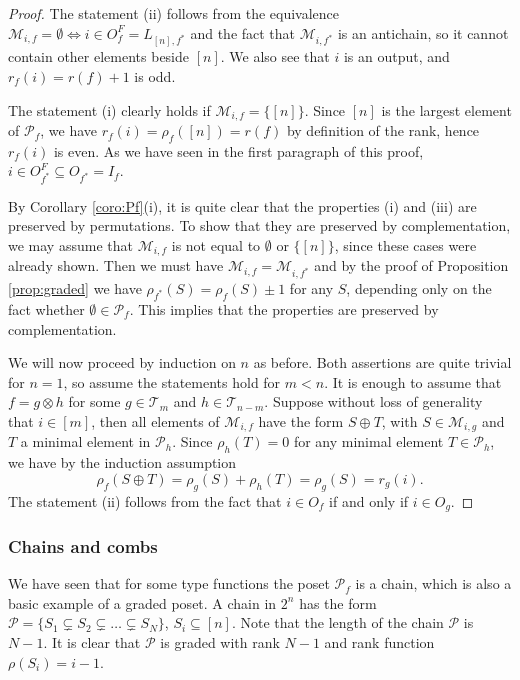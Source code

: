 \documentclass[12pt]{article}
\theoremstyle{definition}
\theoremstyle{remark}
\def\Me{\mathcal M}
\def\Te{\mathcal T}
\def\Pe{\mathcal P}
\begin{document}
\begin{proof} The statement  (ii) follows from the equivalence $\Me_{i,f}=\emptyset \iff
i\in O_f^F=L_{[n],f^*}$ and the fact that $\Me_{i,f^*}$ is an antichain, so it cannot
contain other elements beside $[n]$. We also see that $i$ is an output, and
$r_f(i)=r(f)+1$ is odd. 

The statement (i) clearly holds if $\Me_{i,f}=\{[n]\}$.  Since $[n]$ is the largest
element of $\Pe_f$, we have $r_f(i)=\rho_f([n])=r(f)$  by definition of the rank, hence
$r_{f}(i)$ is even. As we have seen in the first paragraph of this proof,  $i\in
O^F_{f^*}\subseteq O_{f^*}=I_f$. 


By Corollary \ref{coro:Pf}(i),  it is
quite clear that the properties (i) and (iii) are preserved by permutations. 
To show that they are preserved by complementation, we may assume that $\Me_{i,f}$ is not equal
to $\emptyset$ or  $\{[n]\}$, since these cases were already shown.
Then we must have $\Me_{i,f}=\Me_{i,f^*}$ and by the
proof of Proposition \ref{prop:graded} we have  
$\rho_{f^*}(S)=\rho_f(S)\pm 1$ for any $S$, depending only on the fact whether $\emptyset
\in \Pe_f$. This implies that the properties are preserved by complementation.  


We will now proceed by induction on $n$ as before. Both  assertions are quite trivial for $n=1$,
so assume the statements hold for $m<n$. It is enough to assume that
$f=g\otimes h$ for some $g\in \Te_m$ and $h\in \Te_{n-m}$. 
Suppose without loss of generality that $i\in [m]$, then all elements of $\Me_{i,f}$ have
the form $S\oplus T$, with $S\in \Me_{i,g}$ and  $T$ a minimal element in $\Pe_h$. 
 Since $\rho_h(T)=0$ for any minimal element $T\in \Pe_h$, we have
by the induction assumption
\[
\rho_f(S\oplus T)=\rho_g(S)+\rho_h(T)=\rho_g(S)= r_g(i).
\]
The statement (ii) follows from the fact that $i\in O_f$ if and only if $i\in O_g$.


\end{proof}


\subsubsection{Chains and combs}

 We have seen that for some type functions the poset $\Pe_f$ is a chain, which is also a
 basic example of a graded poset. A chain in $2^n$ has the form  $\Pe=\{S_1\subsetneq S_2\subsetneq \dots \subsetneq
S_N\}$, $S_i\subseteq [n]$. Note that the length of the chain $\Pe$ is $N-1$.
It is clear that  $\Pe$ is graded with rank $N-1$
and rank function $\rho(S_i)=i-1$. 
\end{document}
